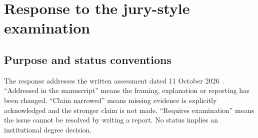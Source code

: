 \chapter{Response to the jury-style examination}
\label{app:jury}
\section{Purpose and status conventions}
The response addresses the written assessment dated 11 October 2026~\cite{jury}. ``Addressed in the manuscript'' means the framing, explanation or reporting has been changed. ``Claim narrowed'' means missing evidence is explicitly acknowledged and the stronger claim is not made. ``Requires examination'' means the issue cannot be resolved by writing a report. No status implies an institutional degree decision.

